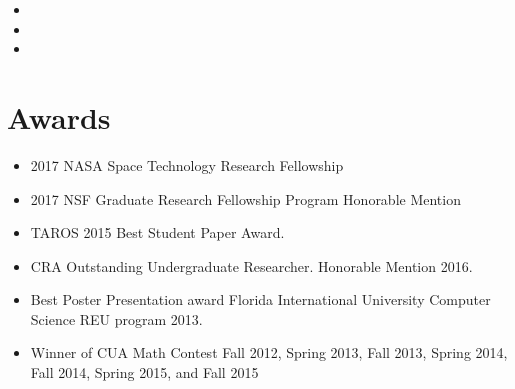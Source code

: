\documentclass[11pt,a4paper,sans]{moderncv}        %
\begin{document}
\vspace{3pt}

\begin{itemize}

\item{}

\item{}  %
\item{}

\end{itemize}


\section{Awards}

\vspace{6pt}

\begin{itemize}

\item{2017 NASA Space Technology Research Fellowship}

\vspace{6pt}

\item{2017 NSF Graduate Research Fellowship Program Honorable Mention}

\vspace{6pt}

\item{TAROS 2015 Best Student Paper Award.}

\vspace{6pt}

\item{CRA Outstanding Undergraduate Researcher.  Honorable Mention 2016.}

\vspace{6pt}

\item{Best Poster Presentation award Florida International University Computer Science REU program 2013.}

\vspace{6pt}

\item{Winner of CUA Math Contest Fall 2012, Spring 2013, Fall 2013, Spring 2014, Fall 2014, Spring 2015, and Fall 2015}

\end{itemize}
\end{document}
